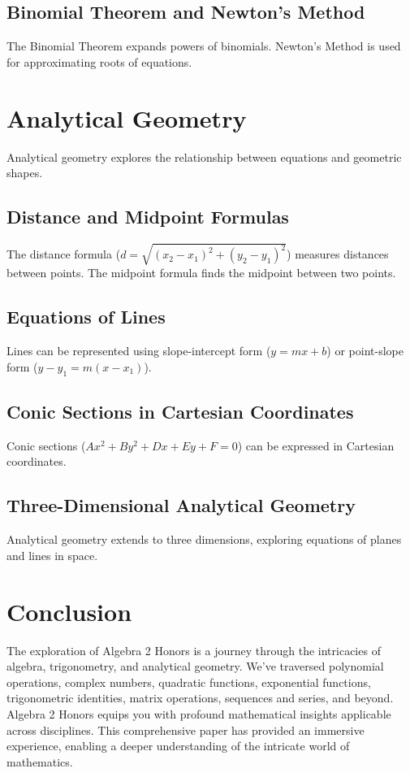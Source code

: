 \documentclass{article}
\begin{document}
\subsection{Binomial Theorem and Newton's Method}
The Binomial Theorem expands powers of binomials. Newton's Method is used for approximating roots of equations.

\section{Analytical Geometry}
Analytical geometry explores the relationship between equations and geometric shapes.

\subsection{Distance and Midpoint Formulas}
The distance formula (\(d = \sqrt{(x_2 - x_1)^2 + (y_2 - y_1)^2}\)) measures distances between points. The midpoint formula finds the midpoint between two points.

\subsection{Equations of Lines}
Lines can be represented using slope-intercept form (\(y = mx + b\)) or point-slope form (\(y - y_1 = m(x - x_1)\)).

\subsection{Conic Sections in Cartesian Coordinates}
Conic sections (\(Ax^2 + By^2 + Dx + Ey + F = 0\)) can be expressed in Cartesian coordinates.

\subsection{Three-Dimensional Analytical Geometry}
Analytical geometry extends to three dimensions, exploring equations of planes and lines in space.

\section{Conclusion}
The exploration of Algebra 2 Honors is a journey through the intricacies of algebra, trigonometry, and analytical geometry. We've traversed polynomial operations, complex numbers, quadratic functions, exponential functions, trigonometric identities, matrix operations, sequences and series, and beyond. Algebra 2 Honors equips you with profound mathematical insights applicable across disciplines. This comprehensive paper has provided an immersive experience, enabling a deeper understanding of the intricate world of mathematics.
\end{document}
